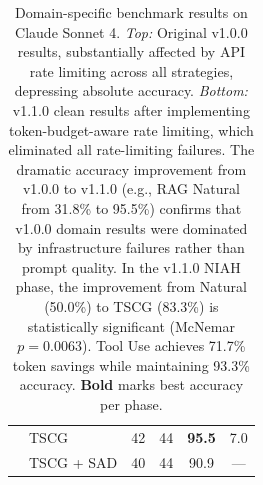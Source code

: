 \begin{table}[t]
\begin{tabular}{@{}l l ccc c@{}}
    & TSCG                & 42 & 44 & \textbf{95.5} & 7.0 \\
    & TSCG + SAD          & 40 & 44 & 90.9 & --- \\
\bottomrule
\end{tabular}
\caption{Domain-specific benchmark results on Claude Sonnet 4. \emph{Top:} Original v1.0.0 results, substantially affected by API rate limiting across all strategies, depressing absolute accuracy. \emph{Bottom:} v1.1.0 clean results after implementing token-budget-aware rate limiting, which eliminated all rate-limiting failures. The dramatic accuracy improvement from v1.0.0 to v1.1.0 (e.g., RAG Natural from 31.8\% to 95.5\%) confirms that v1.0.0 domain results were dominated by infrastructure failures rather than prompt quality. In the v1.1.0 NIAH phase, the improvement from Natural (50.0\%) to TSCG (83.3\%) is statistically significant (McNemar $p=0.0063$). Tool Use achieves 71.7\% token savings while maintaining 93.3\% accuracy. \textbf{Bold} marks best accuracy per phase.}
\label{tab:domain-results}
\end{table}

